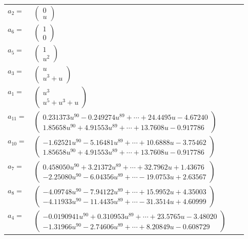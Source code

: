 \documentclass[1p]{elsarticle_modified}
\theoremstyle{definition}
\begin{document}
\begin{tabular}{m{7pt} m{180pt} m{7pt} m{180pt} }
\flushright $a_{2}=$&$\begin{pmatrix}0\\u\end{pmatrix}$ \\
\flushright $a_{6}=$&$\begin{pmatrix}1\\0\end{pmatrix}$ \\
\flushright $a_{5}=$&$\begin{pmatrix}1\\u^2\end{pmatrix}$ \\
\flushright $a_{3}=$&$\begin{pmatrix}u\\u^3+u\end{pmatrix}$ \\
\flushright $a_{1}=$&$\begin{pmatrix}u^3\\u^5+u^3+u\end{pmatrix}$ \\
\flushright $a_{11}=$&$\begin{pmatrix}0.231373 u^{90}-0.249274 u^{89}+\cdots+24.4495 u-4.67240\\1.85658 u^{90}+4.91553 u^{89}+\cdots+13.7608 u-0.917786\end{pmatrix}$ \\
\flushright $a_{10}=$&$\begin{pmatrix}-1.62521 u^{90}-5.16481 u^{89}+\cdots+10.6888 u-3.75462\\1.85658 u^{90}+4.91553 u^{89}+\cdots+13.7608 u-0.917786\end{pmatrix}$ \\
\flushright $a_{7}=$&$\begin{pmatrix}0.458050 u^{90}+3.21372 u^{89}+\cdots+32.7962 u+1.43676\\-2.25080 u^{90}-6.04356 u^{89}+\cdots-19.0753 u+2.63567\end{pmatrix}$ \\
\flushright $a_{8}=$&$\begin{pmatrix}-4.09748 u^{90}-7.94122 u^{89}+\cdots+15.9952 u+4.35003\\-4.11933 u^{90}-11.4435 u^{89}+\cdots-31.3514 u+4.60999\end{pmatrix}$ \\
\flushright $a_{4}=$&$\begin{pmatrix}-0.0190941 u^{90}+0.310953 u^{89}+\cdots+23.5765 u-3.48020\\-1.31966 u^{90}-2.74606 u^{89}+\cdots+8.20849 u-0.608729\end{pmatrix}$ \\

\end{tabular}
\end{document}
